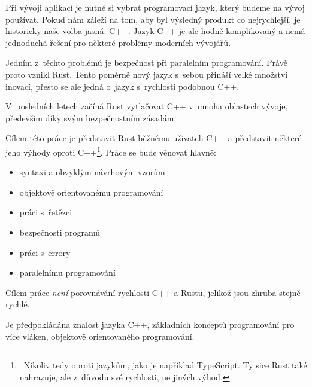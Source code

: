 \documentclass[main.tex]{subfiles}
\begin{document}


Při vývoji aplikací je nutné si vybrat programovací jazyk, který budeme na vývoj
používat. Pokud nám záleží na tom, aby byl výsledný produkt co nejrychlejší,
je historicky naše volba jasná: C++. Jazyk C++ je ale hodně komplikovaný a nemá
jednoduchá řešení pro některé problémy moderních vývojářů.

Jedním z~těchto problémů je bezpečnost při paralelním programování. Právě proto
vznikl Rust. Tento poměrně nový jazyk s~sebou přináší velké množství inovací, přesto
se ale jedná o~jazyk s~rychlostí podobnou C++.

V~posledních letech začíná Rust vytlačovat C++ v~mnoha oblastech vývoje, především
díky svým bezpečnostním zásadám.


Cílem této práce je představit Rust běžnému uživateli C++ a představit některé jeho výhody
oproti C++\footnote{~Nikoliv tedy oproti jazykům, jako je například TypeScript. Ty sice
    Rust také nahrazuje, ale z~důvodu své rychlosti, ne jiných výhod.
}. Práce se bude věnovat hlavně:
\begin{itemize}
    \item syntaxi a obvyklým návrhovým vzorům
    \item objektově orientovanému programování
    \item práci s~řetězci
    \item bezpečnosti programů
    \item práci s~errory
    \item paralelnímu programování
\end{itemize}

Cílem práce \emph{není} porovnávání rychlosti C++ a Rustu, jelikož jsou zhruba stejně
rychlé.


Je předpokládána znalost jazyka C++, základních konceptů programování pro více vláken,
objektově orientovaného programování.
\end{document}
